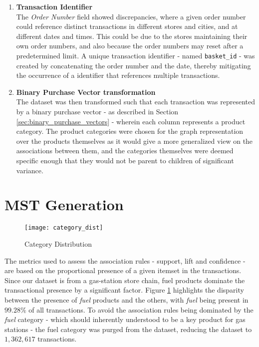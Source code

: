 \begin{enumerate}
\item \textbf{Transaction Identifier}\\
The \textit{Order Number} field showed discrepancies, where a given order number could reference distinct transactions in different stores and cities, and at different dates and times. 
This could be due to the stores maintaining their own order numbers, and also because the order numbers may reset after a predetermined limit.
A unique transaction identifier - named \texttt{basket\_id} - was created by concatenating the order number and the date, thereby mitigating the occurrence of a identifier that references multiple transactions.

\item \textbf{Binary Purchase Vector transformation}\\
The dataset was then transformed such that each transaction was represented by a binary purchase vector - as described in Section \ref{sec:binary_purchase_vectors} - wherein each column represents a product category. The product categories were chosen for the graph representation over the products themselves as it would give a more generalized view on the associations between them, and the categories themselves were deemed specific enough that they would not be parent to children of significant variance.

\end{enumerate} 
\section{MST Generation}
\begin{figure}[H]
\centering
\texttt{[image: category\_dist]}
\caption{Category Distribution}
\label{fig:cat_dist}
\end{figure}
The metrics used to assess the association rules - support, lift and confidence - are based on the proportional presence of a given itemset in the transactions. Since our dataset is from a gas-station store chain, fuel products dominate the transactional presence by a significant factor. Figure \ref{fig:cat_dist} highlights the disparity between the presence of \textit{fuel} products and the others, with \textit{fuel} being present in $99.28\%$ of all transactions. To avoid the association rules being dominated by the \textit{fuel} category - which should inherently understood to be a key product for gas stations - the fuel category was purged from the dataset, reducing the dataset to $1,362,617$ transactions.


